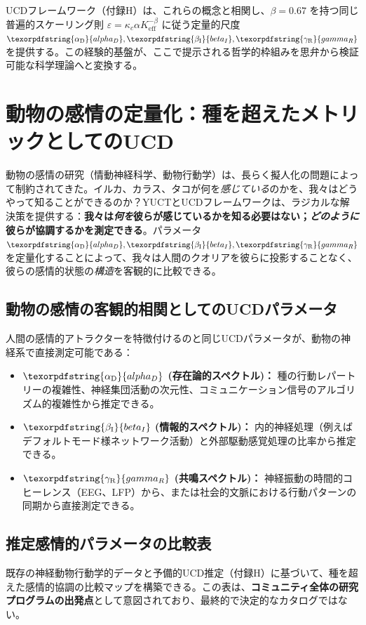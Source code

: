 \documentclass[12pt,a4paper]{article}
\DeclareRobustCommand{\alD}{\texorpdfstring{\ensuremath{\alpha_{\mathrm{D}}}}{alpha_D}}
\DeclareRobustCommand{\beI}{\texorpdfstring{\ensuremath{\beta_{\mathrm{I}}}}{beta_I}}
\DeclareRobustCommand{\gaR}{\texorpdfstring{\ensuremath{\gamma_{\mathrm{R}}}}{gamma_R}}
\newcommand{\eff}{\mathrm{eff}}
\newcommand{\Ke}{K_{\eff}}
\begin{document}
	UCDフレームワーク（付録H）は、これらの概念と相関し、\(\beta = 0.67\) を持つ同じ普遍的スケーリング則 \(\varepsilon = \kappa_c \alpha \Ke^{-\beta}\) に従う定量的尺度 \(\alD, \beI, \gaR\) を提供する。この経験的基盤が、ここで提示される哲学的枠組みを思弁から検証可能な科学理論へと変換する。
	
	\section{動物の感情の定量化：種を超えたメトリックとしてのUCD}
	
	動物の感情の研究（情動神経科学、動物行動学）は、長らく擬人化の問題によって制約されてきた。イルカ、カラス、タコが何を\textit{感じている}のかを、我々はどうやって知ることができるのか？YUCTとUCDフレームワークは、ラジカルな解決策を提供する：\textbf{我々は\textit{何を}彼らが感じているかを知る必要はない；\textit{どのように}彼らが協調するかを測定できる}。パラメータ \(\alD, \beI, \gaR\) を定量化することによって、我々は人間のクオリアを彼らに投影することなく、彼らの感情的状態の\textit{構造}を客観的に比較できる。
	
	\subsection{動物の感情の客観的相関としてのUCDパラメータ}
	
	人間の感情的アトラクターを特徴付けるのと同じUCDパラメータが、動物の神経系で直接測定可能である：
	
	\begin{itemize}
		\item \textbf{\(\alD\) (存在論的スペクトル)：} 種の行動レパートリーの複雑性、神経集団活動の次元性、コミュニケーション信号のアルゴリズム的複雑性から推定できる。
		\item \textbf{\(\beI\) (情報的スペクトル)：} 内的神経処理（例えばデフォルトモード様ネットワーク活動）と外部駆動感覚処理の比率から推定できる。
		\item \textbf{\(\gaR\) (共鳴スペクトル)：} 神経振動の時間的コヒーレンス（EEG、LFP）から、または社会的文脈における行動パターンの同期から直接測定できる。
	\end{itemize}
	
	\subsection{推定感情的パラメータの比較表}
	
	既存の神経動物行動学的データと予備的UCD推定（付録H）に基づいて、種を超えた感情的協調の比較マップを構築できる。この表は、\textbf{コミュニティ全体の研究プログラムの出発点}として意図されており、最終的で決定的なカタログではない。
	
\end{document}

